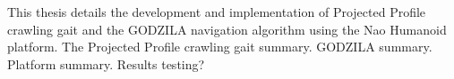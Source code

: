 {}
{
This thesis details the development and implementation of Projected Profile
crawling gait and the GODZILA navigation algorithm using the Nao Humanoid
platform. 
The Projected Profile crawling gait summary.
GODZILA summary.
Platform summary.
Results testing?
\clearpage}
{\endmsabstract}
